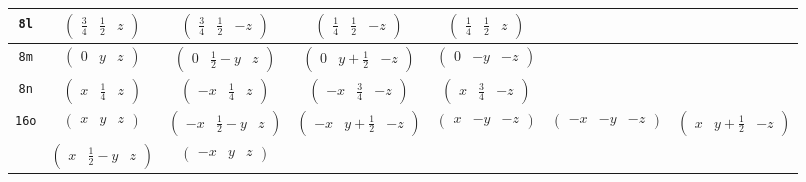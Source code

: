 \documentclass[fleqn,9pt,landscape]{jsarticle}
\begin{document}
\begin{center}
\begin{longtable}{ccccccc}
{\tt 8l} & $ \begin{pmatrix} \frac{3}{4} & \frac{1}{2} & z \end{pmatrix} $ & $ \begin{pmatrix} \frac{3}{4} & \frac{1}{2} & - z \end{pmatrix} $ & $ \begin{pmatrix} \frac{1}{4} & \frac{1}{2} & - z \end{pmatrix} $ & $ \begin{pmatrix} \frac{1}{4} & \frac{1}{2} & z \end{pmatrix} $ & $  $ & $  $ \\ \hline
{\tt 8m} & $ \begin{pmatrix} 0 & y & z \end{pmatrix} $ & $ \begin{pmatrix} 0 & \frac{1}{2} - y & z \end{pmatrix} $ & $ \begin{pmatrix} 0 & y + \frac{1}{2} & - z \end{pmatrix} $ & $ \begin{pmatrix} 0 & - y & - z \end{pmatrix} $ & $  $ & $  $ \\ \hline
{\tt 8n} & $ \begin{pmatrix} x & \frac{1}{4} & z \end{pmatrix} $ & $ \begin{pmatrix} - x & \frac{1}{4} & z \end{pmatrix} $ & $ \begin{pmatrix} - x & \frac{3}{4} & - z \end{pmatrix} $ & $ \begin{pmatrix} x & \frac{3}{4} & - z \end{pmatrix} $ & $  $ & $  $ \\ \hline
{\tt 16o} & $ \begin{pmatrix} x & y & z \end{pmatrix} $ & $ \begin{pmatrix} - x & \frac{1}{2} - y & z \end{pmatrix} $ & $ \begin{pmatrix} - x & y + \frac{1}{2} & - z \end{pmatrix} $ & $ \begin{pmatrix} x & - y & - z \end{pmatrix} $ & $ \begin{pmatrix} - x & - y & - z \end{pmatrix} $ & $ \begin{pmatrix} x & y + \frac{1}{2} & - z \end{pmatrix} $ \\
& $ \begin{pmatrix} x & \frac{1}{2} - y & z \end{pmatrix} $ & $ \begin{pmatrix} - x & y & z \end{pmatrix} $ & $  $ & $  $ & $  $ & $  $ \\
\end{longtable}
\end{center}
\end{document}
